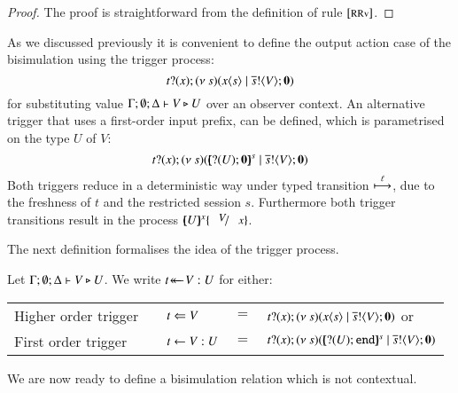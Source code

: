 \begin{proof}
	The proof is straightforward from the definition of rule ${\footnotesize [\textrm{RRv}]}$.
\end{proof}

As we discussed previously it is convenient to define
the output action case of the bisimulation using the
trigger process:
%
\[
	t ? (x) ; (\nu\ s)(x\langle s \rangle \;|\; \overline{s} ! \langle V \rangle ; \mathbf{0})
\]
%
\noi for substituting value $\Gamma; \emptyset; \Delta \vdash V \triangleright U$
over an observer context.
An alternative trigger that uses a first-order input prefix,
can be defined, which is parametrised on the type $U$ of $V$:
%
\[
	t ? (x) ; (\nu\ s)([\!\!(? (U) ; \mathbf{0})\!\!]^{s} \;|\; \overline{s} ! \langle V \rangle ; \mathbf{0})
\]
%
Both triggers reduce in a deterministic way under
typed transition $\stackrel{\ell}{\longmapsto}$, due to the
freshness of $t$ and the restricted session $s$. Furthermore
both trigger transitions result in the process
$\mapchar{U}{x} \subst{V}{x}$.

The next definition formalises the idea of the trigger process.
%
\begin{definition}\rm
	Let $\Gamma; \emptyset; \Delta \vdash V \triangleright U$.
	We write $\trigger{t}{V}{U}$ for either:
%
	\begin{center}
		\begin{tabular}{lclcl}
			Higher order trigger & & $t \Leftarrow V$ &$=$& $t ? (x) ; (\nu\ s)(x\langle s \rangle \;|\; \overline{s} ! \langle V \rangle ; \mathbf{0})$ or\\
			First order trigger & & $t \leftarrow V:U$ &$=$& $t ? (x) ; (\nu\ s)([\!\!(? (U) ; \mathtt{end})\!\!]^{s} \;|\; \overline{s} ! \langle V \rangle ; \mathbf{0})$
		\end{tabular}
	\end{center}
\end{definition}

We are now ready to define a bisimulation relation which is not
contextual.

